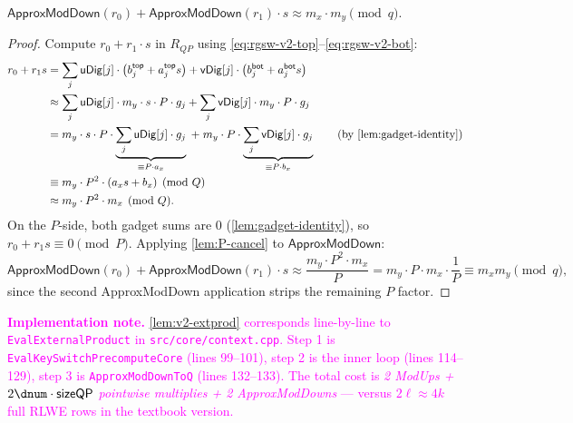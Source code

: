 \begin{lemma}
\label{lem:v2-extprod}
$\mathsf{ApproxModDown}(r_0) + \mathsf{ApproxModDown}(r_1) \cdot s \approx m_x \cdot m_y \pmod q$.
\end{lemma}

\begin{proof}
Compute $r_0 + r_1 \cdot s$ in $R_{QP}$ using \eqref{eq:rgsw-v2-top}--\eqref{eq:rgsw-v2-bot}:
\begin{align}
    r_0 + r_1 s &= \sum_j \mathsf{uDig}[j] \cdot \big(b_j^{\mathsf{top}} + a_j^{\mathsf{top}} s\big) + \mathsf{vDig}[j] \cdot \big(b_j^{\mathsf{bot}} + a_j^{\mathsf{bot}} s\big) \\
                &\approx \sum_j \mathsf{uDig}[j] \cdot m_y \cdot s \cdot P \cdot g_j + \sum_j \mathsf{vDig}[j] \cdot m_y \cdot P \cdot g_j \\
                &= m_y \cdot s \cdot P \cdot \underbrace{\sum_j \mathsf{uDig}[j] \cdot g_j}_{\equiv P \cdot a_x} \;+\; m_y \cdot P \cdot \underbrace{\sum_j \mathsf{vDig}[j] \cdot g_j}_{\equiv P \cdot b_x} \tag{by \autoref{lem:gadget-identity}} \\
                &\equiv m_y \cdot P^2 \cdot (a_x s + b_x) \pmod{Q} \\
                &\approx m_y \cdot P^2 \cdot m_x \pmod{Q}.
\end{align}
On the $P$-side, both gadget sums are $0$ (\autoref{lem:gadget-identity}), so $r_0 + r_1 s \equiv 0 \pmod{P}$. Applying \autoref{lem:P-cancel} to $\mathsf{ApproxModDown}$:
\begin{equation}
    \mathsf{ApproxModDown}(r_0) + \mathsf{ApproxModDown}(r_1) \cdot s \approx \frac{m_y \cdot P^2 \cdot m_x}{P} = m_y \cdot P \cdot m_x \cdot \frac{1}{P} \equiv m_x m_y \pmod q,
\end{equation}
since the second \textsf{ApproxModDown} application strips the remaining $P$ factor.
\end{proof}

\noindent\textcolor{magenta}{\textbf{Implementation note.} \autoref{lem:v2-extprod} corresponds line-by-line to \texttt{EvalExternalProduct} in \texttt{src/core/context.cpp}. Step 1 is \texttt{EvalKeySwitchPrecomputeCore} (lines 99--101), step 2 is the inner loop (lines 114--129), step 3 is \texttt{ApproxModDownToQ} (lines 132--133). The total cost is \emph{2 ModUps + $2\dnum \cdot \mathsf{sizeQP}$ pointwise multiplies + 2 ApproxModDowns} --- versus $2\ell \approx 4k$ full RLWE rows in the textbook version.}

